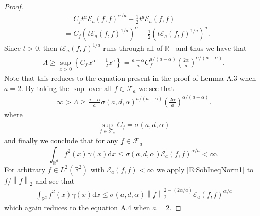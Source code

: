 \documentclass[a4paper,11pt]{article}
\numberwithin{equation}{section}
\numberwithin{equation}{section}
\theoremstyle{plain}
\theoremstyle{definition}
\newcommand{\ud}{\ensuremath{\mathrm{d} }}
\newcommand{\Norm}[1]{\left\|  #1   \right\|}
\newcommand{\R}{\mathbb{R}}
\begin{document}
\begin{proof}
\begin{align*}
            & = C_f t^{\alpha} \mathcal{E}_a(f,f)^{\alpha/a} - \frac{1}{2}t^a \mathcal{E}_a(f,f) \\
            & = C_f \left(t\mathcal{E}_a(f,f)^{1/a}\right)^\alpha - \frac{1}{2} \left( t \mathcal{E}_a(f,f)^{1/a}\right)^a.
  \end{align*}
  Since $t>0$, then $ t\mathcal{E}_a(f,f)^{1/a}$ runs through all of $\R_+$ and thus we have that
  \begin{align*}
    \Lambda \ge \sup_{x>0} \left\{ C_fx^\alpha - \frac{1}{2}x^a \right\} = \frac{a-\alpha}{a}C_f^{a/(a-\alpha)}\left(\frac{2\alpha }{a}\right)^{\alpha/(a-\alpha)}.
  \end{align*}
  Note that this reduces to the equation present in the proof of Lemma A.3 \cite{ChenAOP12} when
  $a=2$. By taking the $\sup$ over all $f\in \mathcal{F}_a$ we see that
  \begin{align*}
    \infty > \Lambda \ge \frac{a-\alpha}{a}\sigma(a,d,\alpha)^{a/(a-\alpha)}\left(\frac{2\alpha }{a}\right)^{\alpha/(a-\alpha)}.
  \end{align*}
  where
  \begin{align*}
    \sup_{f\in \mathcal{F}_a} C_f = \sigma(a, d,\alpha)
  \end{align*}
  and finally we conclude that for any $f\in \mathcal{F}_a$
  \begin{equation} \label{E:SobIneqNorm1}
    \int_{\R^d} f^2(x) \gamma(x)\ud x \le \sigma(a,d,\alpha) \mathcal{E}_a(f,f)^{\alpha/a} < \infty.
  \end{equation}
  For arbitrary $f\in L^2(\R^2)$ with $\mathcal{E}_a(f,f) < \infty$ we apply \eqref{E:SobIneqNorm1}
  to $f/\Norm{f}_2$ and see that
  \begin{align*}
    \int_{\R^d} f^2(x) \gamma(x) \ud x \le \sigma(a,d,\alpha) \Norm{f}_2^{2-(2\alpha/a)} \mathcal{E}_a(f,f)^{\alpha/a}
  \end{align*}
  which again reduces to the equation A.4 \cite{ChenAOP12} when $a=2$.
\end{proof}
\end{document}
